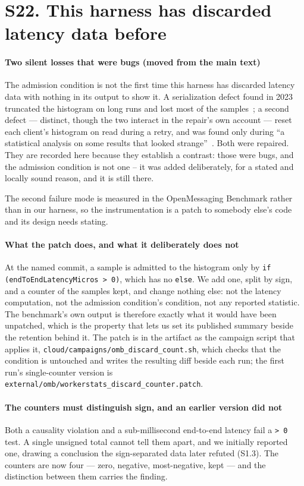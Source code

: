 \documentclass[10pt,journal,onecolumn]{IEEEtran}
\begin{document}
\section{S22. This harness has discarded latency data before}

\paragraph{Two silent losses that were bugs (moved from the main text)}
The admission condition is not the first time this harness has discarded latency data with
nothing in its output to show it. A serialization defect found in 2023 truncated the histogram
on long runs and lost most of the samples~\cite{omb_pr398}; a second defect --- distinct,
though the two interact in the repair's own account --- reset each client's histogram on
read during a retry, and was found only during ``a statistical analysis on some results that
looked strange''~\cite{vanlightly2023}. Both were repaired. They are recorded here because
they establish a contrast: those were bugs, and the admission condition is not one --
it was added deliberately, for a stated and locally sound reason, and it is still there.

The second failure mode is measured in the OpenMessaging Benchmark rather than in our harness, so
the instrumentation is a patch to somebody else's code and its design needs stating.

\paragraph{What the patch does, and what it deliberately does not} At the named commit, a sample
is admitted to the histogram only by \texttt{if (endToEndLatencyMicros > 0)}, which has no
\texttt{else}. We add one, split by sign, and a counter of the samples kept, and change nothing
else: not the latency computation, not the admission condition's condition, not any reported
statistic. The benchmark's own output is therefore exactly what it would have been unpatched,
which is the property that lets us set its published summary beside the retention behind it.
The patch is in the artifact as the campaign script that applies it,
\texttt{cloud/campaigns/omb\_discard\_count.sh}, which checks that the condition is untouched and
writes the resulting diff beside each run; the first run's single-counter version is
\texttt{external/omb/workerstats\_discard\_counter.patch}.

\paragraph{The counters must distinguish sign, and an earlier version did not} Both a causality
violation and a sub-millisecond end-to-end latency fail a \texttt{> 0} test. A single unsigned total cannot
tell them apart, and we initially reported one, drawing a conclusion the sign-separated data later refuted (S1.3). The counters are now four --- zero, negative,
most-negative, kept --- and the distinction between them carries the finding.
\end{document}

